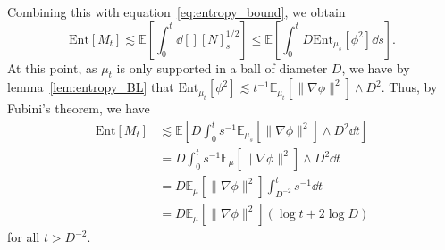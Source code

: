 Combining this with equation~\eqref{eq:entropy_bound}, we obtain 
\[\text{Ent}[M_t] \lesssim \mathbb{E}\left[\int_0^t \dd[] [N]_s^{1 / 2}\right]
  \le \mathbb{E}\left[\int_0^t D \text{Ent}_{\mu_s}[\phi^2] \dd s\right].\]
At this point, as \(\mu_t\) is only supported in a ball of diameter \(D\), we have by 
lemma~\ref{lem:entropy_BL} that \(\text{Ent}_{\mu_t}[\phi^2] \lesssim t^{-1}\mathbb{E}_{\mu_t}[\|\nabla \phi\|^2] \wedge D^2\). Thus, 
by Fubini's theorem, we have
\begin{align*}
  \text{Ent}[M_t] & \lesssim \mathbb{E}\left[D \int_0^t s^{-1}\mathbb{E}_{\mu_s}[\|\nabla \phi\|^2] \wedge D^2 \dd t\right]\\
    & = D \int_0^t s^{-1}\mathbb{E}_\mu[\|\nabla \phi\|^2] \wedge D^2 \dd t\\
    & = D \mathbb{E}_\mu[\|\nabla \phi\|^2] \int_{D^{-2}}^t s^{-1}\dd t\\
    & = D \mathbb{E}_\mu[\|\nabla \phi\|^2] (\log t + 2\log D)
\end{align*}
for all \(t > D^{-2}\).